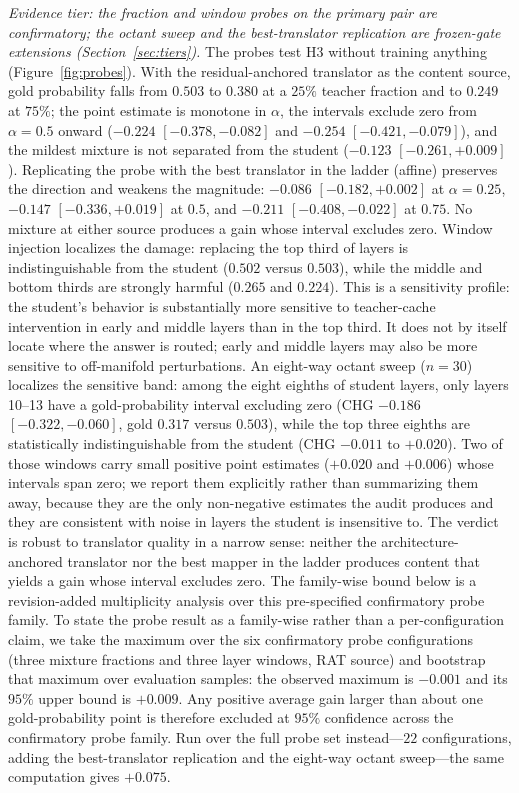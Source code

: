 \documentclass[10pt]{article}
\begin{document}
\emph{Evidence tier: the fraction and window probes on the primary pair are
confirmatory; the octant sweep and the best-translator replication are
frozen-gate extensions (Section~\ref{sec:tiers}).}
The probes test H3 without training anything (Figure~\ref{fig:probes}). With the
residual-anchored translator as the content source, gold probability falls from
$0.503$ to $0.380$ at a $25\%$ teacher fraction and to $0.249$ at $75\%$; the
point estimate is monotone in $\alpha$, the intervals exclude zero from
$\alpha{=}0.5$ onward ($-0.224$ $[-0.378, -0.082]$ and $-0.254$
$[-0.421, -0.079]$), and the mildest mixture is not separated from the student
($-0.123$ $[-0.261, +0.009]$). Replicating the probe with the best translator in
the ladder (affine) preserves the direction and weakens the magnitude: $-0.086$
$[-0.182, +0.002]$ at $\alpha{=}0.25$, $-0.147$ $[-0.336, +0.019]$ at $0.5$, and
$-0.211$ $[-0.408, -0.022]$ at $0.75$. No mixture at either source produces a
gain whose interval excludes zero. Window injection localizes the damage:
replacing the top third of layers is indistinguishable from the student
($0.502$ versus $0.503$), while the middle and bottom thirds are strongly
harmful ($0.265$ and $0.224$). This is a sensitivity profile: the student's
behavior is substantially more sensitive to teacher-cache intervention in
early and middle layers than in the top third. It does not by itself locate
where the answer is routed; early and middle layers may also be more sensitive
to off-manifold perturbations. An eight-way octant sweep ($n{=}30$)
localizes the sensitive band: among the eight eighths of student layers, only
layers 10--13 have a gold-probability interval excluding zero (CHG $-0.186$
$[-0.322, -0.060]$, gold $0.317$ versus $0.503$), while the top three eighths
are statistically indistinguishable from the student (CHG $-0.011$ to
$+0.020$). Two of those windows carry small positive point estimates
($+0.020$ and $+0.006$) whose intervals span zero; we report them explicitly
rather than summarizing them away, because they are the only non-negative
estimates the audit produces and they are consistent with noise in layers the
student is insensitive to. The verdict is robust to translator quality in a
narrow sense: neither the architecture-anchored translator nor the best mapper
in the ladder produces content that yields a gain whose interval excludes zero.
The family-wise bound below is a revision-added multiplicity analysis over this pre-specified
confirmatory probe family. To state the probe result as a family-wise rather than a per-configuration claim, we take
the maximum over the six confirmatory probe configurations (three mixture
fractions and three layer windows, RAT source) and bootstrap that maximum over
evaluation samples: the observed maximum is $-0.001$ and its $95\%$ upper bound
is $+0.009$. Any positive average gain larger than about one gold-probability
point is therefore excluded at $95\%$ confidence across the confirmatory probe
family. Run over the full probe set instead---$22$ configurations, adding the
best-translator replication and the eight-way octant sweep---the same
computation gives $+0.075$.
\end{document}
